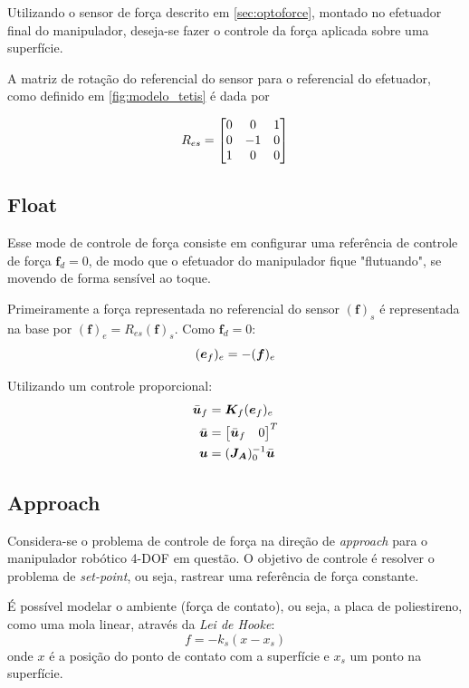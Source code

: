 Utilizando o sensor de força descrito em \ref{sec:optoforce}, montado no efetuador final do manipulador, deseja-se fazer o controle da força aplicada sobre uma superfície. 

A matriz de rotação do referencial do sensor para o referencial do efetuador, como definido em \ref{fig:modelo_tetis} é dada por

\begin{equation}
R_{es} = \begin{bmatrix}
  0 & 0 & 1 \\
  0 & -1 & 0 \\
  1 & 0 & 0
\end{bmatrix}
\end{equation}

\subsection{Float}  \label{sec:forca_float}
Esse mode de controle de força consiste em configurar uma referência de controle de força $\bm{f}_d = 0$, de modo que o efetuador do manipulador fique "flutuando", se movendo de forma sensível ao toque.

Primeiramente a força representada no referencial do sensor $(\bm{f})_s$ é representada na base por $(\bm{f})_e = R_{es} (\bm{f})_s$.
Como $\bm{f}_d = 0$:
\begin{equation}
(\bm{e}_f)_e = - (\bm{f})_e \\
\end{equation}

Utilizando um controle proporcional:
\begin{align}
\bar{\bm{u}}_f &= \bm{K}_f (\bm{e}_f)_e \\
\bar{\bm{u}} &= \begin{bmatrix} \bar{\bm{u}}_f & 0\end{bmatrix}^T\\
\bm{u} &= (\bm{J_A})_0^{-1} \bar{\bm{u}}
\end{align}

\subsection{Approach} \label{sec:forca_approach}
Considera-se o problema de controle de força na direção de \textit{approach} para o manipulador robótico 4-DOF em questão. O objetivo de controle é resolver o problema de \textit{set-point}, ou seja, rastrear uma referência de força constante.

É possível modelar o ambiente (força de contato), ou seja, a placa de poliestireno, como uma mola linear, através da \textit{Lei de Hooke}: 
\begin{equation}
f = -k_s (x - x_s)
\end{equation}
onde $x$ é a posição do ponto de contato com a superfície e $x_s$ um ponto na superfície.


